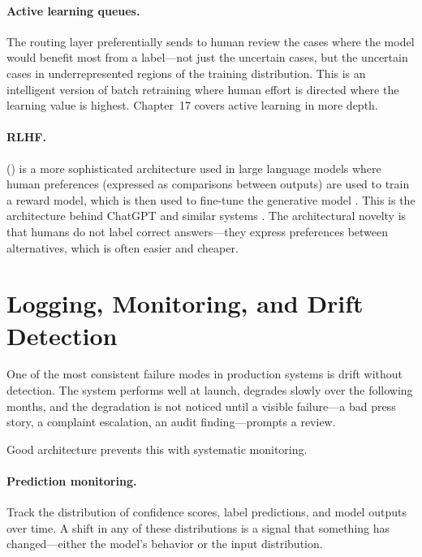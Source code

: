 \paragraph{Active learning queues.} The routing layer preferentially sends to human review the cases where the model would benefit most from a label---not just the uncertain cases, but the uncertain cases in underrepresented regions of the training distribution. This is an intelligent version of batch retraining where human effort is directed where the learning value is highest. Chapter~17 covers active learning in more depth.

\paragraph{RLHF.}  (\rlhf) is a more sophisticated architecture used in large language models where human preferences (expressed as comparisons between outputs) are used to train a reward model, which is then used to fine-tune the generative model \autocite{christiano2017deep}. This is the architecture behind ChatGPT and similar systems \autocite{ouyang2022training}. The architectural novelty is that humans do not label correct answers---they express preferences between alternatives, which is often easier and cheaper.

\section{Logging, Monitoring, and Drift Detection}
\label{sec:ch08-monitoring}

One of the most consistent failure modes in production \hitl systems is drift without detection. The system performs well at launch, degrades slowly over the following months, and the degradation is not noticed until a visible failure---a bad press story, a complaint escalation, an audit finding---prompts a review.

Good \hitl architecture prevents this with systematic monitoring.

\paragraph{Prediction monitoring.} Track the distribution of confidence scores, label predictions, and model outputs over time. A shift in any of these distributions is a signal that something has changed---either the model's behavior or the input distribution.


